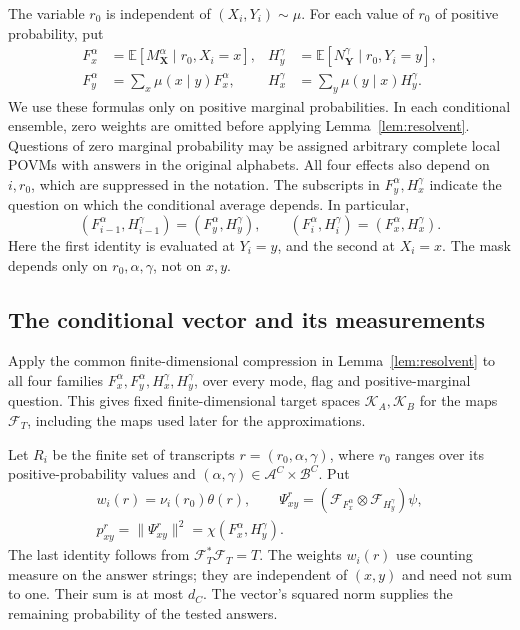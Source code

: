The variable $r_0$ is independent of $(X_i,Y_i)\sim\mu$. For each value
of $r_0$ of positive probability, put
\begin{align*}
 F_x^\alpha&=\mathbb E[M_{\mathbf X}^\alpha\mid r_0,X_i=x],&
 H_y^\gamma&=\mathbb E[N_{\mathbf Y}^\gamma\mid r_0,Y_i=y],\\
 F_y^\alpha&=\sum_x\mu(x\mid y)F_x^\alpha,&
 H_x^\gamma&=\sum_y\mu(y\mid x)H_y^\gamma.
\end{align*}
We use these formulas only on positive marginal probabilities. In each
conditional ensemble, zero weights are omitted before applying
Lemma~\ref{lem:resolvent}. Questions of zero marginal probability may be
assigned arbitrary complete local POVMs with answers in the original
alphabets. All four effects also depend on $i,r_0$, which are suppressed
in the notation.
The subscripts in $F_y^\alpha,H_x^\gamma$ indicate the question on which
the conditional average depends. In particular,
\[
 (F_{i-1}^\alpha,H_{i-1}^\gamma)=(F_y^\alpha,H_y^\gamma),
 \qquad
 (F_i^\alpha,H_i^\gamma)=(F_x^\alpha,H_x^\gamma).
\]
Here the first identity is evaluated at $Y_i=y$, and the second at
$X_i=x$. The mask depends only on $r_0,\alpha,\gamma$, not on $x,y$.

\subsection{The conditional vector and its measurements}

Apply the common finite-dimensional compression in
Lemma~\ref{lem:resolvent} to all four families
$F_x^\alpha,F_y^\alpha,H_x^\gamma,H_y^\gamma$, over every mode,
flag and positive-marginal question. This gives fixed finite-dimensional
target spaces $\mathcal K_A,\mathcal K_B$ for the maps $\mathcal F_T$,
including the maps used later for the approximations.

Let $R_i$ be the finite set of transcripts $r=(r_0,\alpha,\gamma)$,
where $r_0$ ranges over its positive-probability values and
$(\alpha,\gamma)\in\mathcal A^C\times\mathcal B^C$. Put
\begin{gather*}
 w_i(r)=\nu_i(r_0)\theta(r),\qquad
 \Psi_{xy}^r=(\mathcal F_{F_x^\alpha}\otimes
                         \mathcal F_{H_y^\gamma})\psi,\\
 p_{xy}^r=\|\Psi_{xy}^r\|^2=\chi(F_x^\alpha,H_y^\gamma).
\end{gather*}
The last identity follows from $\mathcal F_T^*\mathcal F_T=T$.
The weights $w_i(r)$ use counting measure on the answer strings; they
are independent of $(x,y)$ and need not sum to one. Their sum is at
most $d_C$. The vector's squared norm supplies the remaining probability
of the tested answers.

